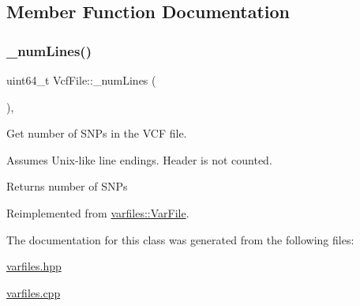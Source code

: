 \subsection{Member Function Documentation}
\mbox{\label{classvarfiles_1_1_vcf_file_aaafc33a691977c8f60c9b129c920ee76}} 
\subsubsection{\texorpdfstring{\+\_\+num\+Lines()}{\_numLines()}}
{\footnotesize\ttfamily uint64\+\_\+t Vcf\+File\+::\+\_\+num\+Lines (\begin{DoxyParamCaption}{ }\end{DoxyParamCaption})\hspace{0.3cm}{\ttfamily [protected]}, {\ttfamily [virtual]}}



Get number of S\+N\+Ps in the V\+CF file. 

Assumes Unix-\/like line endings. Header is not counted.

\begin{DoxyReturn}{Returns}
number of S\+N\+Ps 
\end{DoxyReturn}


Reimplemented from \hyperlink{classvarfiles_1_1_var_file_a029a1a5577fb735c338750d2dec62ab6}{varfiles\+::\+Var\+File}.



The documentation for this class was generated from the following files\+:\begin{DoxyCompactItemize}
\item 
\hyperlink{varfiles_8hpp}{varfiles.\+hpp}\item 
\hyperlink{varfiles_8cpp}{varfiles.\+cpp}\end{DoxyCompactItemize}
